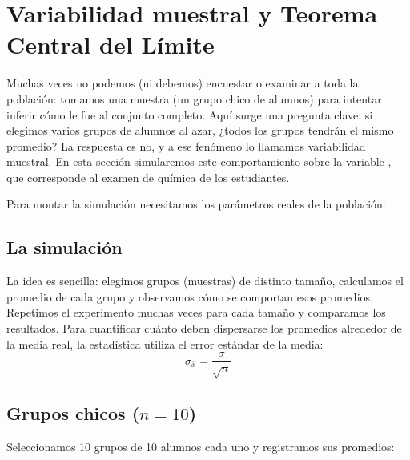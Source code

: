 \section{Variabilidad muestral y Teorema Central del Límite}
Muchas veces no podemos (ni debemos) encuestar o examinar a toda la población: tomamos una
muestra (un grupo chico de alumnos) para intentar inferir cómo le fue al conjunto completo. Aquí
surge una pregunta clave: si elegimos varios grupos de alumnos al azar, ¿todos los grupos tendrán
el mismo promedio? La respuesta es no, y a ese fenómeno lo llamamos variabilidad muestral. En
esta sección simularemos este comportamiento sobre la variable , que
corresponde al examen de química de los estudiantes.

\AnalisisDescriptivo
Para montar la simulación necesitamos los parámetros reales de la población:


\subsection{La simulación}
La idea es sencilla: elegimos grupos (muestras) de distinto tamaño, calculamos el promedio de
cada grupo y observamos cómo se comportan esos promedios. Repetimos el experimento muchas veces
para cada tamaño y comparamos los resultados. Para cuantificar cuánto deben dispersarse los
promedios alrededor de la media real, la estadística utiliza el error estándar de la media:
\begin{equation*}
  \sigma_{\bar{x}} = \frac{\sigma}{\sqrt{n}}
\end{equation*}

\subsection{Grupos chicos ($n = 10$)}
Seleccionamos 10 grupos de 10 alumnos cada uno y registramos sus promedios:

\TablaDeDatos




